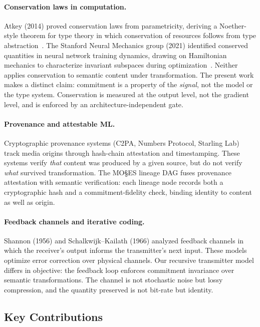 \documentclass[11pt,a4paper]{article}
\begin{document}
\paragraph{Conservation laws in computation.}
Atkey (2014) proved conservation laws from parametricity, deriving a Noether-style theorem for type theory in which conservation of resources follows from type abstraction~\cite{atkey2014}. The Stanford Neural Mechanics group (2021) identified conserved quantities in neural network training dynamics, drawing on Hamiltonian mechanics to characterize invariant subspaces during optimization~\cite{kunin2021}. Neither applies conservation to semantic content under transformation. The present work makes a distinct claim: commitment is a property of the \emph{signal}, not the model or the type system. Conservation is measured at the output level, not the gradient level, and is enforced by an architecture-independent gate.

\paragraph{Provenance and attestable ML.}
Cryptographic provenance systems (C2PA, Numbers Protocol, Starling Lab) track media origins through hash-chain attestation and timestamping. These systems verify \emph{that} content was produced by a given source, but do not verify \emph{what} survived transformation. The MO\S{}ES\texttrademark{} lineage DAG fuses provenance attestation with semantic verification: each lineage node records both a cryptographic hash and a commitment-fidelity check, binding identity to content as well as origin.

\paragraph{Feedback channels and iterative coding.}
Shannon (1956) and Schalkwijk--Kailath (1966) analyzed feedback channels in which the receiver's output informs the transmitter's next input. These models optimize error correction over physical channels. Our recursive transmitter model differs in objective: the feedback loop enforces commitment invariance over semantic transformations. The channel is not stochastic noise but lossy compression, and the quantity preserved is not bit-rate but identity.

\subsection{Key Contributions}
\end{document}
